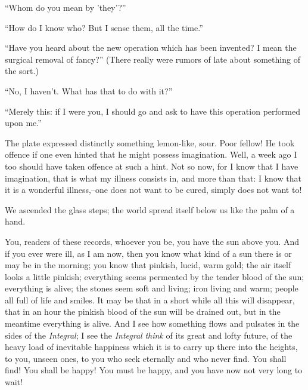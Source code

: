 \documentclass[11pt,openany]{book}
\begin{document}
``Whom do you mean by 'they'?''

``How do I know who? But I sense them, all the time.''

``Have you heard about the new operation which has been invented? I mean the surgical removal of fancy?'' (There really were rumors of late about something of the sort.)

``No, I haven't. What has that to do with it?''

``Merely this: if I were you, I should go and ask to have this operation performed upon me.''

The plate expressed distinctly something lemon-like, sour. Poor fellow! He took offence if one even hinted that he might possess imagination. Well, a week ago I too should have taken offence at such a hint. Not so now, for I know that I have imagination, that is what my illness consists in, and more than that: I know that it is a wonderful illness,--one does not want to be cured, simply does not want to!

We ascended the glass steps; the world spread itself below us like the palm of a hand.

You, readers of these records, whoever you be, you have the sun above you. And if you ever were ill, as I am now, then you know what kind of a sun there is or may be in the morning; you know that pinkish, lucid, warm gold; the air itself looks a little pinkish; everything seems permeated by the tender blood of the sun; everything is alive; the stones seem soft and living; iron living and warm; people all full of life and smiles. It may be that in a short while all this will disappear, that in an hour the pinkish blood of the sun will be drained out, but in the meantime everything is alive. And I see how something flows and pulsates in the sides of the \emph{Integral}; I see the \emph{Integral} \emph{think} of its great and lofty future, of the heavy load of inevitable happiness which it is to carry up there into the heights, to you, unseen ones, to you who seek eternally and who never find. You shall find! You shall be happy! You must be happy, and you have now not very long to wait!
\end{document}
